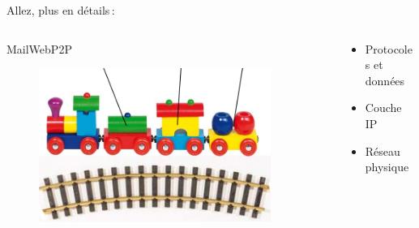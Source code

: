 \begin{frame}{Allez, plus en détails :}
  \begin{columns}
  \begin{column}{0.7\textwidth}
    \hspace{5em}Mail\hspace{4em}Web\hspace{3em}P2P
    \vspace{-1em}
    \begin{figure}
      \includegraphics[width=0.9\textwidth]{concepts/protocoles.png}
    \end{figure}
  \end{column}
  \begin{column}{0.4\textwidth}
    \begin{itemize}
      \vspace{2em}
      \item Protocoles et données
      \item Couche IP
      \vspace{2em}
      \item Réseau physique
    \end{itemize}
  \end{column}
  \end{columns}
\end{frame}

